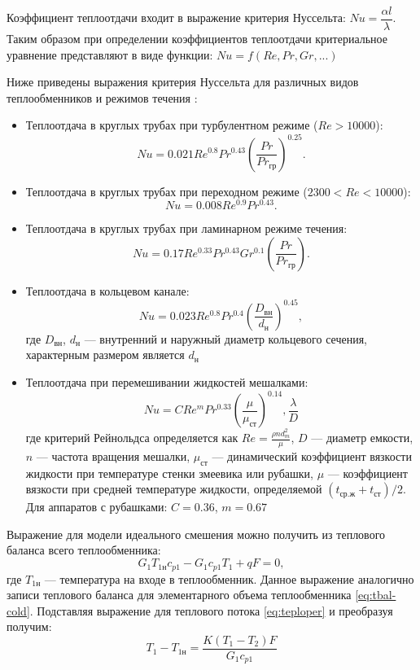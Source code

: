 Коэффициент теплоотдачи входит в выражение критерия Нуссельта: $Nu=\dfrac{\alpha l}{\lambda}$. Таким образом при определении коэффициентов теплоотдачи критериальное уравнение представляют в виде функции: $Nu= f (Re, Pr, Gr, ...)$
 
Ниже приведены выражения критерия Нуссельта для различных видов теплообменников и режимов течения \cite{pavlov}:
 \begin{itemize}
	 \item Теплоотдача в круглых трубах при турбулентном режиме ($Re>10000$):
		 \begin{equation}
		 	Nu=0.021 Re^{0.8} Pr^{0.43} \left( \dfrac{Pr}{Pr_{гр}} \right) ^{0.25} .
		 \end{equation}
	 \item Теплоотдача в круглых трубах при переходном режиме ($2300<Re<10000$):
		 \begin{equation}
		 	Nu=0.008 Re^{0.9} Pr^{0.43}.
		 \end{equation}
	 \item Теплоотдача в круглых трубах при ламинарном режиме течения:
		\begin{equation}
			Nu=0.17 Re^{0.33} Pr^{0.43} Gr^{0.1} \left( \dfrac{Pr}{Pr_{гр}} \right).
		\end{equation}
	 \item  Теплоотдача в кольцевом канале:
		 \begin{equation}
			  Nu=0.023 Re^{0.8} Pr^{0.4} \left(\dfrac{D_{вн}}{d_{н}}\right)^{0.45},
		 \end{equation}
		 где $D_{вн}$, $d_н$ --- внутренний и наружный  диаметр кольцевого сечения, характерным размером является $d_н$
	 \item Теплоотдача при перемешивании жидкостей мешалками:
	 \begin{equation}
		Nu=C Re^m Pr^{0.33} \left(\dfrac{\mu}{\mu_{ст}}\right)^{0.14}, \dfrac{\lambda}{D}
	 \end{equation}
	 где критерий Рейнольдса определяется как $Re=\frac{ \rho n d_m^2}{\mu}$, $D$ --- диаметр емкости, $n$ --- частота вращения мешалки, $\mu_{ст}$ --- динамический коэффициент вязкости жидкости при температуре стенки змеевика или рубашки, $\mu$ --- коэффициент вязкости при средней температуре жидкости, определяемой $(t_{ср.ж}+t_{ст})/2$. Для аппаратов с рубашками: $C=0.36$, $m=0.67$
\end{itemize}

Выражение для модели идеального смешения можно получить из теплового баланса всего теплообменника:
\begin{equation}
G_1 T_{1н} c_{p1}-G_1 c_{p1} T_1 + q F=0,
\end{equation}
где $T_{1н}$ --- температура на входе в теплообменник.
Данное выражение аналогично записи теплового баланса для элементарного объема теплообменника \eqref{eq:tbal-cold}. Подставляя выражение для теплового потока \eqref{eq:teploper} и преобразуя получим:
\begin{equation}
	T_1-T_{1н} = \dfrac{K(T_1-T_2)F}{G_1 c_{p1}}
\end{equation}

